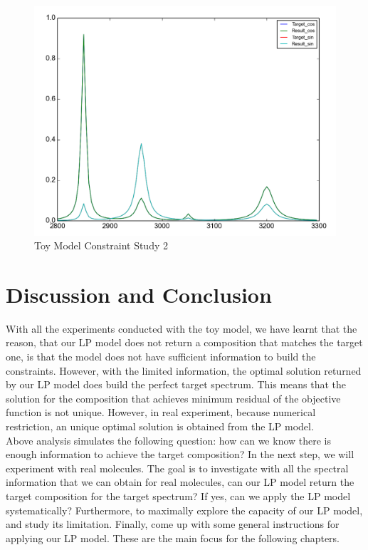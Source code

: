 \begin{figure}[!ht] 
\centering
\includegraphics[scale=0.3]{Figures/toy_model_result_plotting_ir_sin_10candi_constraint_study_experiment5.png} 
\caption{Toy Model Constraint Study 2}\label{fig:3.6}
\end{figure}

\section{Discussion and Conclusion}
With all the experiments conducted with the toy model, we have learnt that the reason, that our LP model does not return a composition that matches the target one, is that the model does not have sufficient information to build the constraints. However, with the limited information, the optimal solution returned by our LP model does build the perfect target spectrum. This means that the solution for the composition that achieves minimum residual of the objective function is not unique. However, in real experiment, because numerical restriction, an unique optimal solution is obtained from the LP model. \\

Above analysis simulates the following question: how can we know there is enough information to achieve the target composition? In the next step, we will experiment with real molecules. The goal is to investigate with all the spectral information that we can obtain for real molecules, can our LP model return the target composition for the target spectrum? If yes, can we apply the LP model systematically? Furthermore, to maximally explore the capacity of our LP model, and study its limitation. Finally, come up with some general instructions for applying our LP model. These are the main focus for the following chapters.\\

		

		 



